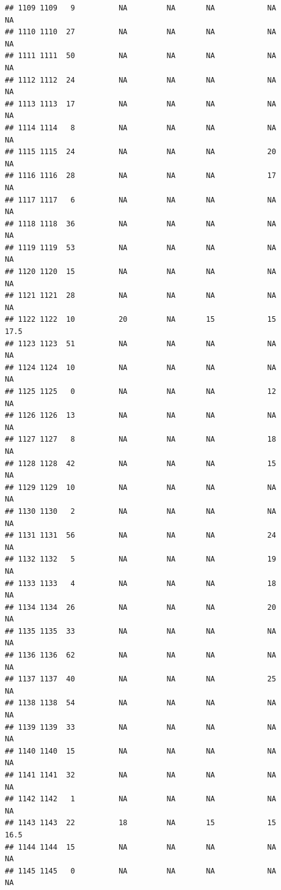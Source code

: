 \documentclass[man]{apa6}
\begin{document}
\begin{verbatim}
## 1109 1109   9          NA         NA       NA            NA       NA
## 1110 1110  27          NA         NA       NA            NA       NA
## 1111 1111  50          NA         NA       NA            NA       NA
## 1112 1112  24          NA         NA       NA            NA       NA
## 1113 1113  17          NA         NA       NA            NA       NA
## 1114 1114   8          NA         NA       NA            NA       NA
## 1115 1115  24          NA         NA       NA            20       NA
## 1116 1116  28          NA         NA       NA            17       NA
## 1117 1117   6          NA         NA       NA            NA       NA
## 1118 1118  36          NA         NA       NA            NA       NA
## 1119 1119  53          NA         NA       NA            NA       NA
## 1120 1120  15          NA         NA       NA            NA       NA
## 1121 1121  28          NA         NA       NA            NA       NA
## 1122 1122  10          20         NA       15            15     17.5
## 1123 1123  51          NA         NA       NA            NA       NA
## 1124 1124  10          NA         NA       NA            NA       NA
## 1125 1125   0          NA         NA       NA            12       NA
## 1126 1126  13          NA         NA       NA            NA       NA
## 1127 1127   8          NA         NA       NA            18       NA
## 1128 1128  42          NA         NA       NA            15       NA
## 1129 1129  10          NA         NA       NA            NA       NA
## 1130 1130   2          NA         NA       NA            NA       NA
## 1131 1131  56          NA         NA       NA            24       NA
## 1132 1132   5          NA         NA       NA            19       NA
## 1133 1133   4          NA         NA       NA            18       NA
## 1134 1134  26          NA         NA       NA            20       NA
## 1135 1135  33          NA         NA       NA            NA       NA
## 1136 1136  62          NA         NA       NA            NA       NA
## 1137 1137  40          NA         NA       NA            25       NA
## 1138 1138  54          NA         NA       NA            NA       NA
## 1139 1139  33          NA         NA       NA            NA       NA
## 1140 1140  15          NA         NA       NA            NA       NA
## 1141 1141  32          NA         NA       NA            NA       NA
## 1142 1142   1          NA         NA       NA            NA       NA
## 1143 1143  22          18         NA       15            15     16.5
## 1144 1144  15          NA         NA       NA            NA       NA
## 1145 1145   0          NA         NA       NA            NA       NA

\end{verbatim}
\end{document}
